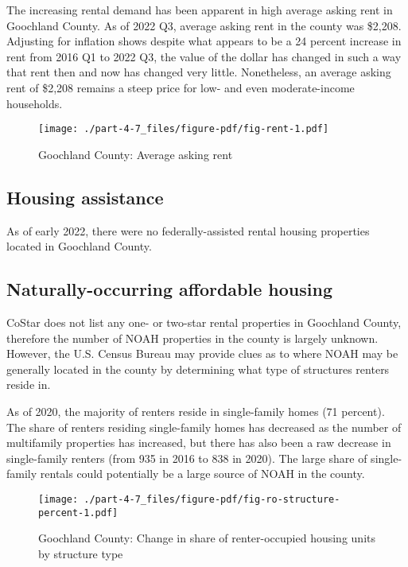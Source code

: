 \documentclass[
  letterpaper,
  DIV=11,
  numbers=noendperiod]{scrreprt}
\begin{document}
The increasing rental demand has been apparent in high average asking
rent in Goochland County. As of 2022 Q3, average asking rent in the
county was \$2,208. Adjusting for inflation shows despite what appears
to be a 24 percent increase in rent from 2016 Q1 to 2022 Q3, the value
of the dollar has changed in such a way that rent then and now has
changed very little. Nonetheless, an average asking rent of \$2,208
remains a steep price for low- and even moderate-income households.

\begin{figure}

{\centering \texttt{[image: ./part-4-7\_files/figure-pdf/fig-rent-1.pdf]}

}

\caption{\label{fig-rent}Goochland County: Average asking rent}

\end{figure}

\hypertarget{housing-assistance-4}{%
\subsection{Housing assistance}\label{housing-assistance-4}}

As of early 2022, there were no federally-assisted rental housing
properties located in Goochland County.

\hypertarget{naturally-occurring-affordable-housing-5}{%
\subsection{Naturally-occurring affordable
housing}\label{naturally-occurring-affordable-housing-5}}

CoStar does not list any one- or two-star rental properties in Goochland
County, therefore the number of NOAH properties in the county is largely
unknown. However, the U.S. Census Bureau may provide clues as to where
NOAH may be generally located in the county by determining what type of
structures renters reside in.

As of 2020, the majority of renters reside in single-family homes (71
percent). The share of renters residing single-family homes has
decreased as the number of multifamily properties has increased, but
there has also been a raw decrease in single-family renters (from 935 in
2016 to 838 in 2020). The large share of single-family rentals could
potentially be a large source of NOAH in the county.

\begin{figure}

{\centering \texttt{[image: ./part-4-7\_files/figure-pdf/fig-ro-structure-percent-1.pdf]}

}

\caption{\label{fig-ro-structure-percent}Goochland County: Change in
share of renter-occupied housing units by structure type}

\end{figure}
\end{document}
